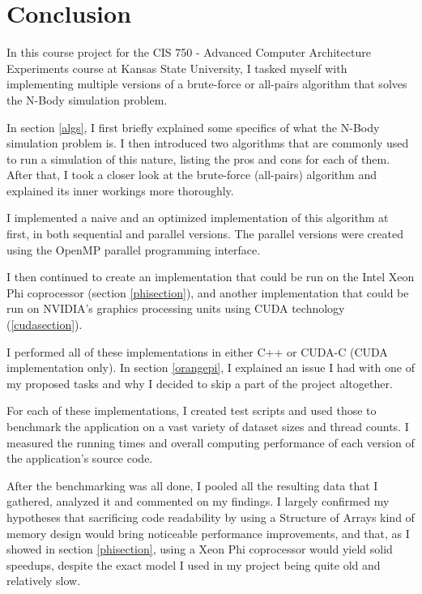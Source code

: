 \documentclass[journal]{IEEEtran}
\begin{document}
	\section{Conclusion}
	
		In this course project for the CIS 750 - Advanced Computer Architecture Experiments course at Kansas State University, I tasked myself with implementing multiple versions of a brute-force or all-pairs algorithm that solves the N-Body simulation problem.
		
		In section \ref{algs}, I first briefly explained some specifics of what the N-Body simulation problem is. I then introduced two algorithms that are commonly used to run a simulation of this nature, listing the pros and cons for each of them. After that, I took a closer look at the brute-force (all-pairs) algorithm and explained its inner workings more thoroughly.
		
		I implemented a naive and an optimized implementation of this algorithm at first, in both sequential and parallel versions. The parallel versions were created using the OpenMP parallel programming interface. 
		
		I then continued to create an implementation that could be run on the Intel Xeon Phi coprocessor (section \ref{phisection}), and another implementation that could be run on NVIDIA's graphics processing units using CUDA technology (\ref{cudasection}). 
		
		I performed all of these implementations in either C++ or CUDA-C (CUDA implementation only). In section \ref{orangepi}, I explained an issue I had with one of my proposed tasks and why I decided to skip a part of the project altogether. 
		
		For each of these implementations, I created test scripts and used those to benchmark the application on a vast variety of dataset sizes and thread counts. I measured the running times and overall computing performance of each version of the application's source code.
		
		After the benchmarking was all done, I pooled all the resulting data that I gathered, analyzed it and commented on my findings. I largely confirmed my hypotheses that sacrificing code readability by using a Structure of Arrays kind of memory design would bring noticeable performance improvements, and that, as I showed in section \ref{phisection}, using a Xeon Phi coprocessor would yield solid speedups, despite the exact model I used in my project being quite old and relatively slow.
		
\end{document}

